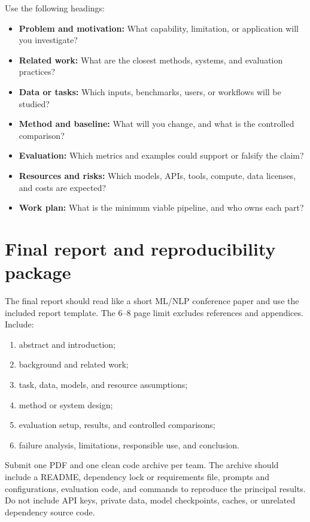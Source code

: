 \documentclass[11pt]{article}
\begin{document}
Use the following headings:

\begin{itemize}
  \item \textbf{Problem and motivation:} What capability, limitation, or application will you investigate?
  \item \textbf{Related work:} What are the closest methods, systems, and evaluation practices?
  \item \textbf{Data or tasks:} Which inputs, benchmarks, users, or workflows will be studied?
  \item \textbf{Method and baseline:} What will you change, and what is the controlled comparison?
  \item \textbf{Evaluation:} Which metrics and examples could support or falsify the claim?
  \item \textbf{Resources and risks:} Which models, APIs, tools, compute, data licenses, and costs are expected?
  \item \textbf{Work plan:} What is the minimum viable pipeline, and who owns each part?
\end{itemize}

\section{Final report and reproducibility package}

The final report should read like a short ML/NLP conference paper and use the included report template. The 6--8 page limit excludes references and appendices. Include:

\begin{enumerate}
  \item abstract and introduction;
  \item background and related work;
  \item task, data, models, and resource assumptions;
  \item method or system design;
  \item evaluation setup, results, and controlled comparisons;
  \item failure analysis, limitations, responsible use, and conclusion.
\end{enumerate}

Submit one PDF and one clean code archive per team. The archive should include a README, dependency lock or requirements file, prompts and configurations, evaluation code, and commands to reproduce the principal results. Do not include API keys, private data, model checkpoints, caches, or unrelated dependency source code.
\end{document}
